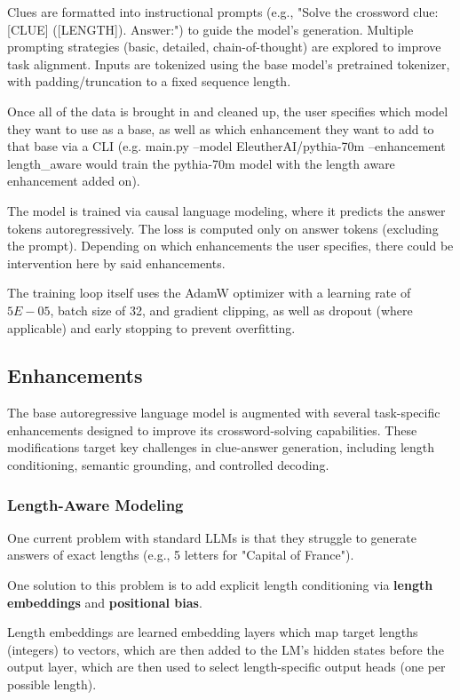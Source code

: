 \documentclass[
	a4paper, %
	10pt, %
	unnumberedsections, %
	twoside, %
]{LTJournalArticle}
\begin{document}
Clues are formatted into instructional prompts (e.g., "Solve the crossword clue: [CLUE] ([LENGTH]). Answer:") to guide the model’s generation. Multiple prompting strategies (basic, detailed, chain-of-thought) are explored to improve task alignment. Inputs are tokenized using the base model’s pretrained tokenizer, with padding/truncation to a fixed sequence length.

Once all of the data is brought in and cleaned up, the user specifies which model they want to use as a base, as well as which enhancement they want to add to that base via a CLI (e.g. main.py --model EleutherAI/pythia-70m --enhancement length\_aware would train the pythia-70m model with the length aware enhancement added on).

The model is trained via causal language modeling, where it predicts the answer tokens autoregressively. The loss is computed only on answer tokens (excluding the prompt). Depending on which enhancements the user specifies, there could be intervention here by said enhancements.

The training loop itself uses  the AdamW optimizer with a learning rate of $5E-05$, batch size of 32, and gradient clipping, as well as dropout (where applicable) and early stopping to prevent overfitting.

\subsection{Enhancements}

The base autoregressive language model is augmented with several task-specific enhancements designed to improve its crossword-solving capabilities. These modifications target key challenges in clue-answer generation, including length conditioning, semantic grounding, and controlled decoding.

\subsubsection{Length-Aware Modeling}
One current problem with standard LLMs is that they struggle to generate answers of exact lengths (e.g., 5 letters for "Capital of France").

One solution to this problem is to add explicit length conditioning via \textbf{length embeddings} and \textbf{positional bias}.

Length embeddings are learned embedding layers which map target lengths (integers) to vectors, which are then added to the LM’s hidden states before the output layer, which are then used to select length-specific output heads (one per possible length).
\end{document}

